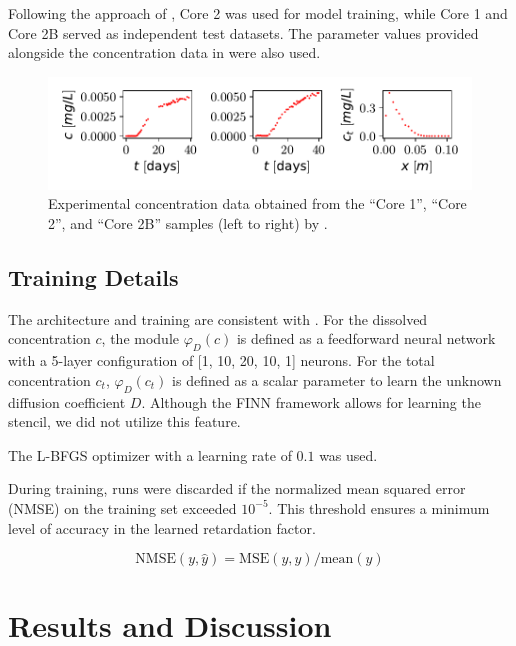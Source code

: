 Following the approach of \cite{finn}, Core 2 was used for model training, while Core 1 and Core 2B served as independent test datasets. The parameter values provided alongside the concentration data in \cite{nowak2016entropy} were also used.


\begin{figure}[h]
    \centering
    \includegraphics{figs/core_data.pdf}
    \caption{Experimental concentration data obtained from the ``Core 1'', ``Core 2'', and ``Core 2B'' samples (left to right) by \cite{nowak2016entropy}.}
    \label{fig:core_data}
\end{figure}



\section{Training Details}
The architecture and training are consistent with \cite{finn}. For the dissolved concentration $c$, the module $\varphi_D(c)$ is defined as a feedforward neural network with a 5-layer configuration of [1, 10, 20, 10, 1] neurons. For the total concentration $c_t$, $\varphi_D(c_t)$ is defined as a scalar parameter to learn the unknown diffusion coefficient $D$. Although the FINN framework allows for learning the stencil, we did not utilize this feature.

The L-BFGS optimizer \cite{malouf2002comparison} with a learning rate of $0.1$ was used.

During training, runs were discarded if the normalized mean squared error (NMSE) on the training set exceeded $10^{-5}$. This threshold ensures a minimum level of accuracy in the learned retardation factor.


\begin{equation*}
    \text{NMSE}(y, \hat{y}) = \text{MSE}(y, \hat{y}) / \text{mean}(y)
\end{equation*}




\chapter{Results and Discussion}
\label{sec:results_and_discussion}

